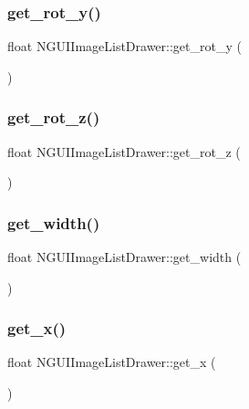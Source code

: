 \subsubsection{\texorpdfstring{get\+\_\+rot\+\_\+y()}{get\_rot\_y()}}
{\footnotesize\ttfamily float N\+G\+U\+I\+Image\+List\+Drawer\+::get\+\_\+rot\+\_\+y (\begin{DoxyParamCaption}{ }\end{DoxyParamCaption})}

\hypertarget{class_n_g_u_i_image_list_drawer_abf1a4676b6844790376c367984ccef1a}{}\label{class_n_g_u_i_image_list_drawer_abf1a4676b6844790376c367984ccef1a} 
\subsubsection{\texorpdfstring{get\+\_\+rot\+\_\+z()}{get\_rot\_z()}}
{\footnotesize\ttfamily float N\+G\+U\+I\+Image\+List\+Drawer\+::get\+\_\+rot\+\_\+z (\begin{DoxyParamCaption}{ }\end{DoxyParamCaption})}

\hypertarget{class_n_g_u_i_image_list_drawer_ac99e4053063f1fac4980fa45ef80b7ee}{}\label{class_n_g_u_i_image_list_drawer_ac99e4053063f1fac4980fa45ef80b7ee} 
\subsubsection{\texorpdfstring{get\+\_\+width()}{get\_width()}}
{\footnotesize\ttfamily float N\+G\+U\+I\+Image\+List\+Drawer\+::get\+\_\+width (\begin{DoxyParamCaption}{ }\end{DoxyParamCaption})}

\hypertarget{class_n_g_u_i_image_list_drawer_abcaaf3cadc1f6e5e51bda9a574d7161b}{}\label{class_n_g_u_i_image_list_drawer_abcaaf3cadc1f6e5e51bda9a574d7161b} 
\subsubsection{\texorpdfstring{get\+\_\+x()}{get\_x()}}
{\footnotesize\ttfamily float N\+G\+U\+I\+Image\+List\+Drawer\+::get\+\_\+x (\begin{DoxyParamCaption}{ }\end{DoxyParamCaption})}


